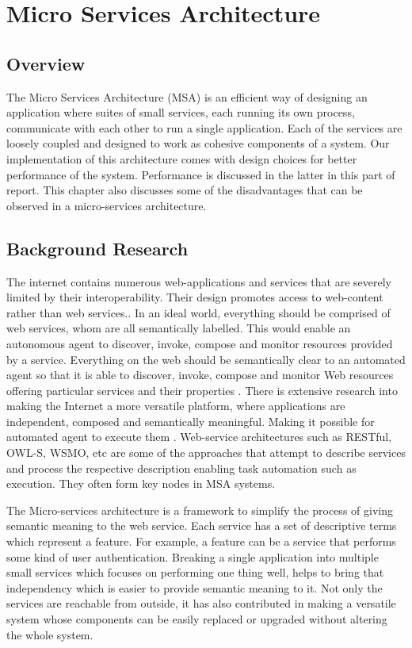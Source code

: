 \chapter{Micro Services Architecture} \label{chapter:MSA}
\section{Overview}
The Micro Services Architecture (MSA) is an efficient way of designing an application where suites of small services, each running its own process, communicate with each other to run a single application. Each of the services are loosely coupled and designed to work as cohesive components of a system.
Our implementation of this architecture comes with design choices for better performance of the system. Performance is discussed in the latter in this part of report. This chapter also discusses some of the disadvantages that can be observed in a micro-services architecture.
\section{Background Research}
The internet contains numerous web-applications and services that are severely limited by their interoperability. Their design promotes access to web-content rather than web services.. In an ideal world, everything should be comprised of web services, whom are all semantically labelled. This would enable an autonomous agent to discover, invoke, compose and monitor resources provided by a service. Everything on the web should be semantically clear to an automated agent so that it is able to discover, invoke, compose and monitor Web resources offering particular services and their properties \citep{martin-2004}. There is extensive research into making the Internet a more versatile platform, where applications are independent, composed and semantically meaningful. Making it possible for automated agent to execute them \citep{MSA}. Web-service architectures such as RESTful, OWL-S, WSMO, etc are some of the approaches that attempt to describe services and process the respective description enabling task automation such as execution. They often form key nodes in MSA systems. 

The Micro-services architecture is a framework to simplify the process of giving semantic meaning to the web service. Each service has a set of descriptive terms which represent a feature. For example, a feature can be a service that performs some kind of user authentication. Breaking a single application into multiple small services which focuses on performing one thing well, helps to bring that independency which is easier to provide semantic meaning to it. Not only the services are reachable from outside, it has also contributed in making a versatile system whose components can be easily replaced or upgraded without altering the whole system.


